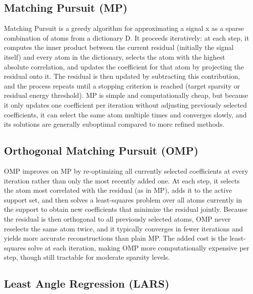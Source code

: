 \subsection{Matching Pursuit (MP)}

Matching Pursuit \citep{mallat1993matching} is a greedy algorithm for approximating a signal x as a sparse combination of atoms from a dictionary D.
It proceeds iteratively: at each step, it computes the inner product between the current residual (initially the signal itself)
and every atom in the dictionary, selects the atom with the highest absolute correlation, and updates the coefficient for that
atom by projecting the residual onto it. The residual is then updated by subtracting this contribution, and the process repeats
until a stopping criterion is reached (target sparsity or residual energy threshold). MP is simple and computationally cheap,
but because it only updates one coefficient per iteration without adjusting previously selected coefficients, it can select
the same atom multiple times and converges slowly, and its solutions are generally suboptimal compared to more refined methods.

\subsection{Orthogonal Matching Pursuit (OMP)}

OMP \citep{342465} improves on MP by re-optimizing all currently selected coefficients at every iteration rather than only the most recently
added one. At each step, it selects the atom most correlated with the residual (as in MP), adds it to the active support set,
and then solves a least-squares problem over all atoms currently in the support to obtain new coefficients that minimize the
residual jointly. Because the residual is then orthogonal to all previously selected atoms, OMP never reselects the same atom
twice, and it typically converges in fewer iterations and yields more accurate reconstructions than plain MP. The added cost is
the least-squares solve at each iteration, making OMP more computationally expensive per step, though still tractable for
moderate sparsity levels.

\subsection{Least Angle Regression (LARS)}

